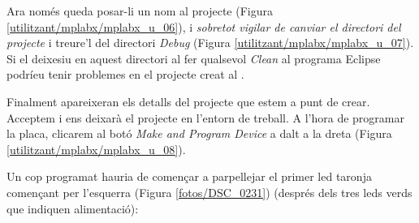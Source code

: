 Ara només queda posar-li un nom al projecte (Figura \ref{utilitzant/mplabx/mplabx_u_06}), i \emph{sobretot vigilar de canviar el directori del projecte} i treure'l del directori \emph{Debug} (Figura \ref{utilitzant/mplabx/mplabx_u_07}). Si el deixesiu en aquest directori al fer qualsevol \emph{Clean} al programa Eclipse podríeu tenir problemes en el projecte creat al \MplabX.



Finalment apareixeran els detalls del projecte que estem a punt de crear.
Acceptem i ens deixarà el projecte en l'entorn de treball.
A l'hora de programar la placa, clicarem al botó \emph{Make and Program Device} a dalt a la dreta (Figura \ref {utilitzant/mplabx/mplabx_u_08}).


Un cop programat hauria de començar a parpellejar el primer led taronja començant per l'esquerra (Figura \ref{fotos/DSC_0231}) (després dels tres leds verds que indiquen alimentació):


